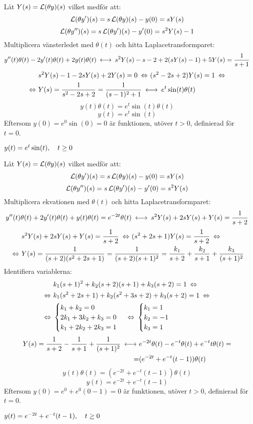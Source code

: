 \begin{task}{5.2}
	Låt $Y(s)=\operatorname{\mathcal{L}}(\theta y)(s)$ vilket medför att:
	\[\operatorname{\mathcal{L}}(\theta y')(s)=s\operatorname{\mathcal{L}}(\theta y)(s)-y(0)=sY(s)\]
	\[\operatorname{\mathcal{L}}(\theta y'')(s)=s\operatorname{\mathcal{L}}(\theta y')(s)-y'(0)=s^2Y(s)-1\]
	Multiplicera vänsterledet med $\theta(t)$ och hitta Laplacetransformparet:
	\[y''(t)\theta(t)-2y'(t)\theta(t)+2y(t)\theta(t) \llra
	s^2Y(s)-s-2+2(sY(s)-1)+5Y(s)=\frac{1}{s+1}\]
	\begin{align*}
	&s^2Y(s)-1-2sY(s)+2Y(s)=0 \lra
	(s^2-2s+2)Y(s)=1 \lra \\ \lra
	&Y(s)=
	\frac{1}{s^2-2s+2}=
	\frac{1}{(s-1)^2+1} \llra
	e^{t}\sin(t)\theta(t)
	\end{align*}
	\[y(t)\theta(t)=e^{t}\sin(t)\theta(t)\]
	\[y(t)=e^{t}\sin(t)\]
	Eftersom $y(0)=e^{0}\sin(0)=0$ är funktionen, utöver $t>0$, definierad för $t=0$.
	
	\ans $y(t)=e^{t}\sin(t), \quad t \ge 0$
\end{task}

\begin{task}{5.3}
	Låt $Y(s)=\operatorname{\mathcal{L}}(\theta y)(s)$ vilket medför att:
	\[\operatorname{\mathcal{L}}(\theta y')(s)=s\operatorname{\mathcal{L}}(\theta y)(s)-y(0)=sY(s)\]
	\[\operatorname{\mathcal{L}}(\theta y'')(s)=s\operatorname{\mathcal{L}}(\theta y')(s)-y'(0)=s^2Y(s)\]
	Multiplicera ekvationen med $\theta(t)$ och hitta Laplacetransformparet:
	\[y''(t)\theta(t)+2y'(t)\theta(t)+y(t)\theta(t)=e^{-2t}\theta(t) \llra
	s^2Y(s)+2sY(s)+Y(s)=\frac{1}{s+2}\]
	\begin{align*}
	&s^2Y(s)+2sY(s)+Y(s)=\frac{1}{s+2} \lra
	(s^2+2s+1)Y(s)=\frac{1}{s+2} \lra \\ \lra
	&Y(s)=
	\frac{1}{(s+2)(s^2+2s+1)}=
	\frac{1}{(s+2)(s+1)^2}=
	\frac{k_1}{s+2}+\frac{k_2}{s+1}+\frac{k_3}{(s+1)^2}
	\end{align*}
	Identifiera variablerna:
	\begin{align*}
	&k_1(s+1)^2+k_2(s+2)(s+1)+k_3(s+2)=1 \lra \\ \lra
	&k_1(s^2+2s+1)+k_2(s^2+3s+2)+k_3(s+2)=1 \lra \\ \lra
	&\begin{cases}
	k_1+k_2=0 \\
	2k_1+3k_2+k_3=0 \\
	k_1+2k_2+2k_3=1
	\end{cases} \lra
	\begin{cases}
	k_1=1 \\
	k_2=-1 \\
	k_3=1
	\end{cases}
	\end{align*}
	\begin{align*}
	Y(s)=
	\frac{1}{s+2}-\frac{1}{s+1}+\frac{1}{(s+1)^2}\llra
	&e^{-2t}\theta(t)-e^{-t}\theta(t)+e^{-t}t\theta(t)= \\ =
	&(e^{-2t}+e^{-t}(t-1))\theta(t)
	\end{align*}
	\[y(t)\theta(t)=(e^{-2t}+e^{-t}(t-1))\theta(t)\]
	\[y(t)=e^{-2t}+e^{-t}(t-1)\]
	Eftersom $y(0)=e^{0}+e^{0}(0-1)=0$ är funktionen, utöver $t>0$, definierad för $t=0$.
	
	\ans $y(t)=e^{-2t}+e^{-t}(t-1), \quad t \ge 0$
\end{task}

